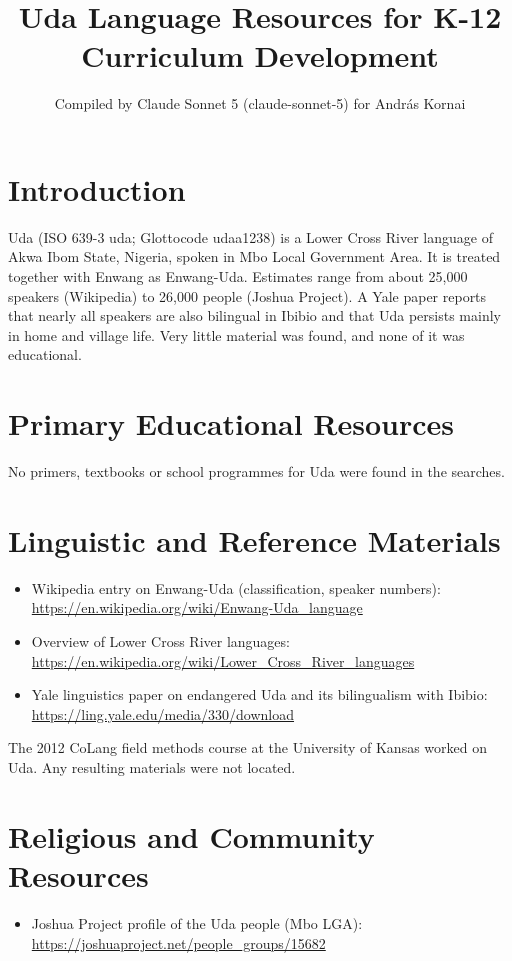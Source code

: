 \documentclass[12pt]{article}
\title{Uda Language Resources for K-12 Curriculum Development}
\author{Compiled by Claude Sonnet 5 (claude-sonnet-5) for Andr\'as Kornai}
\date{}
\begin{document}
\maketitle

\section{Introduction}
Uda (ISO 639-3 uda; Glottocode udaa1238) is a Lower Cross River language of Akwa Ibom State, Nigeria, spoken in Mbo Local Government Area. It is treated together with Enwang as Enwang-Uda. Estimates range from about 25,000 speakers (Wikipedia) to 26,000 people (Joshua Project). A Yale paper reports that nearly all speakers are also bilingual in Ibibio and that Uda persists mainly in home and village life. Very little material was found, and none of it was educational.

\section{Primary Educational Resources}
No primers, textbooks or school programmes for Uda were found in the searches.

\section{Linguistic and Reference Materials}
\begin{itemize}
\item Wikipedia entry on Enwang-Uda (classification, speaker numbers): \url{https://en.wikipedia.org/wiki/Enwang-Uda_language}
\item Overview of Lower Cross River languages: \url{https://en.wikipedia.org/wiki/Lower_Cross_River_languages}
\item Yale linguistics paper on endangered Uda and its bilingualism with Ibibio: \url{https://ling.yale.edu/media/330/download}
\end{itemize}
The 2012 CoLang field methods course at the University of Kansas worked on Uda. Any resulting materials were not located.

\section{Religious and Community Resources}
\begin{itemize}
\item Joshua Project profile of the Uda people (Mbo LGA): \url{https://joshuaproject.net/people_groups/15682}
\end{itemize}
\end{document}
